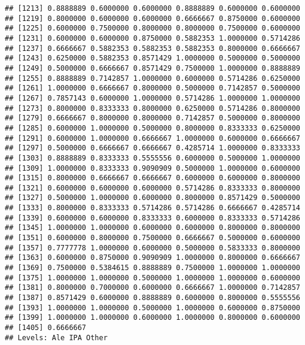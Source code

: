 \documentclass[]{article}
\begin{document}
\begin{verbatim}
## [1213] 0.8888889 0.6000000 0.6000000 0.8888889 0.6000000 0.6000000
## [1219] 0.8000000 0.6000000 0.6000000 0.6666667 0.8750000 0.6000000
## [1225] 0.6000000 0.7500000 0.8000000 0.8000000 0.7500000 0.6000000
## [1231] 0.6000000 0.6000000 0.8750000 0.5882353 1.0000000 0.5714286
## [1237] 0.6666667 0.5882353 0.5882353 0.5882353 0.8000000 0.6666667
## [1243] 0.6250000 0.5882353 0.8571429 1.0000000 0.5000000 0.5000000
## [1249] 0.5000000 0.6666667 0.8571429 0.7500000 1.0000000 0.8888889
## [1255] 0.8888889 0.7142857 1.0000000 0.6000000 0.5714286 0.6250000
## [1261] 1.0000000 0.6666667 0.8000000 0.5000000 0.7142857 0.5000000
## [1267] 0.7857143 0.6000000 1.0000000 0.5714286 1.0000000 1.0000000
## [1273] 0.8000000 0.8333333 0.8000000 0.6250000 0.5714286 0.8000000
## [1279] 0.6666667 0.8000000 0.8000000 0.7142857 0.5000000 0.8000000
## [1285] 0.6000000 1.0000000 0.5000000 0.8000000 0.8333333 0.6250000
## [1291] 0.6000000 1.0000000 0.6666667 1.0000000 0.6000000 0.6666667
## [1297] 0.5000000 0.6666667 0.6666667 0.4285714 1.0000000 0.8333333
## [1303] 0.8888889 0.8333333 0.5555556 0.6000000 0.5000000 1.0000000
## [1309] 1.0000000 0.8333333 0.9090909 0.5000000 1.0000000 0.6000000
## [1315] 0.8000000 0.6666667 0.6666667 0.6000000 0.6000000 0.8000000
## [1321] 0.6000000 0.6000000 0.6000000 0.5714286 0.8333333 0.8000000
## [1327] 0.5000000 1.0000000 0.6000000 0.8000000 0.8571429 0.5000000
## [1333] 0.8000000 0.8333333 0.5714286 0.5714286 0.6666667 0.4285714
## [1339] 0.6000000 0.6000000 0.8333333 0.6000000 0.8333333 0.5714286
## [1345] 1.0000000 1.0000000 0.6000000 0.6000000 0.8000000 0.8000000
## [1351] 0.6000000 0.8000000 0.7500000 0.6666667 0.5000000 0.6000000
## [1357] 0.7777778 1.0000000 0.6000000 0.5000000 0.5833333 0.8000000
## [1363] 0.6000000 0.8750000 0.9090909 1.0000000 0.8000000 0.6666667
## [1369] 0.7500000 0.5384615 0.8888889 0.7500000 1.0000000 1.0000000
## [1375] 1.0000000 1.0000000 0.5000000 1.0000000 1.0000000 0.6000000
## [1381] 0.8000000 0.7000000 0.6000000 0.6666667 1.0000000 0.7142857
## [1387] 0.8571429 0.6000000 0.8888889 0.6000000 0.8000000 0.5555556
## [1393] 1.0000000 1.0000000 0.5000000 1.0000000 0.6000000 0.8750000
## [1399] 1.0000000 1.0000000 0.6000000 1.0000000 0.8000000 0.6000000
## [1405] 0.6666667
## Levels: Ale IPA Other
\end{verbatim}
\end{document}
